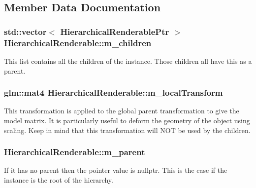 \subsection{Member Data Documentation}
\hypertarget{classHierarchicalRenderable_a0e3d2a642ba4d2ea58c595a1532a6c8a}{
\subsubsection[{m\+\_\+children}]{\setlength{\rightskip}{0pt plus 5cm}std\+::vector$<$ {\bf Hierarchical\+Renderable\+Ptr} $>$ Hierarchical\+Renderable\+::m\+\_\+children\hspace{0.3cm}{\ttfamily [private]}}}\label{classHierarchicalRenderable_a0e3d2a642ba4d2ea58c595a1532a6c8a}
This list contains all the children of the instance. Those children all have this as a parent. \hypertarget{classHierarchicalRenderable_a467e3ba997e6d98af60033fb74333c37}{
\subsubsection[{m\+\_\+local\+Transform}]{\setlength{\rightskip}{0pt plus 5cm}glm\+::mat4 Hierarchical\+Renderable\+::m\+\_\+local\+Transform\hspace{0.3cm}{\ttfamily [private]}}}\label{classHierarchicalRenderable_a467e3ba997e6d98af60033fb74333c37}
This transformation is applied to the global parent transformation to give the model matrix. It is particularly useful to deform the geometry of the object using scaling. Keep in mind that this transformation will N\+O\+T be used by the children. \hypertarget{classHierarchicalRenderable_a8549e3830ff55e5f9ce5d6335421a207}{
\subsubsection[{m\+\_\+parent}]{ Hierarchical\+Renderable\+::m\+\_\+parent\hspace{0.3cm}{\ttfamily [private]}}}\label{classHierarchicalRenderable_a8549e3830ff55e5f9ce5d6335421a207}
If it has no parent then the pointer value is nullptr. This is the case if the instance is the root of the hierarchy.

